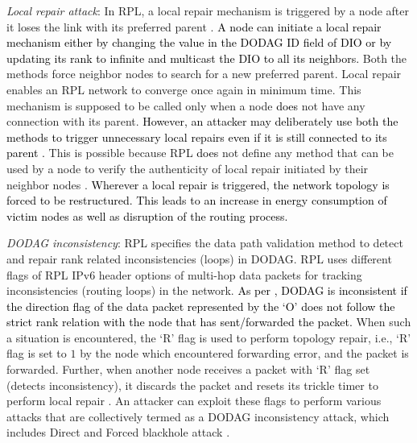 \documentclass[10pt,journal,sort & compress]{IEEEtran}
\begin{document}
\textit{Local repair attack}: In RPL, a local repair mechanism is triggered by a node after it loses the link with its preferred parent \cite{winter2012rpl}. \textcolor{black}{A node can initiate a local repair mechanism either by changing the value in the DODAG ID field of DIO or by updating its rank to infinite and multicast the DIO to all its neighbors.} Both the methods force neighbor nodes to search for a new preferred parent. Local repair enables an RPL network to converge once again in minimum time. This mechanism is supposed to be called only when a node \textcolor{black}{does} not have any connection with its parent. \textcolor{black}{However, an attacker may deliberately use both the methods to trigger unnecessary local repairs even if it is still connected to its parent \cite{Le2012, Le2011, Le2016}.}  This is possible because RPL \textcolor{black}{does} not define any method that can be used by a node to verify the authenticity of local repair initiated by their neighbor nodes \cite{tsao2015security}. \textcolor{black}{Wherever a local repair is triggered, the network topology is forced to be restructured.} \textcolor{black}{This leads to an increase in energy consumption of victim nodes as well as disruption of the routing process.}       

\textit{DODAG inconsistency}: RPL specifies the data path validation method to detect and repair rank 
related inconsistencies (loops) in DODAG. RPL uses different flags of RPL IPv6 header options of multi-hop data packets \cite{hui2012routing} for tracking inconsistencies (routing loops) in the network. \textcolor{black}{As per \cite{winter2012rpl}, DODAG is inconsistent if the direction flag of the data packet represented by the `O’  does not follow the strict rank relation with the node that has sent/forwarded the packet.} When such a situation is encountered, the `R’ flag is used to perform topology repair, i.e., `R' flag is set to $ 1 $ by the node which encountered forwarding error, and the packet is forwarded. Further, when another node receives a packet with `R' flag set (detects inconsistency), it discards the packet and resets its trickle timer to perform local repair \cite{levis2011trickle}. An attacker can exploit these flags to perform various attacks that are collectively termed as a DODAG inconsistency attack, which includes Direct and Forced blackhole attack \cite{Sehgal2014, Mayzaud2015}.  
\end{document}
